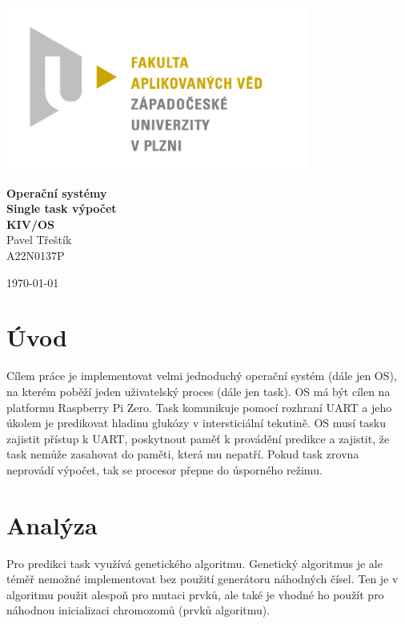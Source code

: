 \documentclass[12pt, letterpaper]{article}
\begin{document}
\begin{titlepage}
\centerline{\includegraphics[width=10cm]{img/logo.jpg}}
\begin{center}
\vspace{30px}
{\huge
\textbf{Operační systémy}\\
\textbf{Single task výpočet}\\
\vspace{1cm}
}
{\large
\textbf{KIV/OS}\\
\vspace{1cm}
}
\vspace{1cm}
{\large
Pavel Třeštík\\
}
{\normalsize
A22N0137P
}
\end{center}
\vspace{\fill}
\hfill
\begin{minipage}[t]{7cm}
\flushright
\today
\end{minipage}
\end{titlepage}
\section{Úvod}
Cílem práce je implementovat velmi jednoduchý operační systém (dále jen OS), na kterém poběží jeden uživatelský proces
(dále jen task). OS má být cílen na platformu Raspberry Pi Zero. Task komunikuje pomocí rozhraní UART a jeho úkolem je
predikovat hladinu glukózy v intersticiální tekutině. OS musí tasku zajistit přístup k UART, poskytnout paměť k
provádění predikce a zajistit, že task nemůže zasahovat do paměti, která mu nepatří. Pokud task zrovna neprovádí
výpočet, tak se procesor přepne do úsporného režimu.
%
\section{Analýza}
Pro predikci task využívá genetického algoritmu. Genetický algoritmus je ale téměř nemožné implementovat bez použití
generátoru náhodných čísel. Ten je v algoritmu použit alespoň pro mutaci prvků, ale také je vhodné ho použít pro
náhodnou inicializaci chromozomů (prvků algoritmu).
\end{document}

